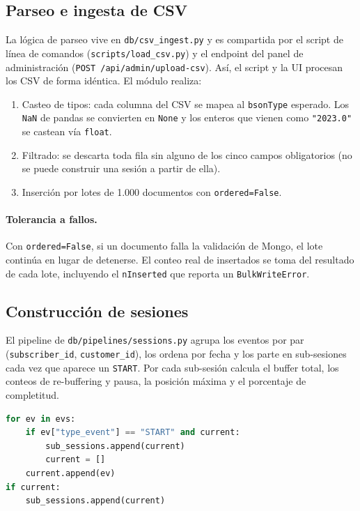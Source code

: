 \documentclass[12pt, letterpaper]{article}
\newcommand{\code}[1]{\texttt{#1}}
\begin{document}
\subsection{Parseo e ingesta de CSV}
La lógica de parseo vive en \code{db/csv\_ingest.py} y es compartida por el
script de línea de comandos (\code{scripts/load\_csv.py}) y el endpoint del panel
de administración (\code{POST /api/admin/upload-csv}). Así, el script y la UI
procesan los CSV de forma idéntica. El módulo realiza:

\begin{enumerate}[leftmargin=*]
  \item Casteo de tipos: cada columna del CSV se mapea al \code{bsonType}
        esperado. Los \code{NaN} de pandas se convierten en \code{None} y los
        enteros que vienen como \code{"2023.0"} se castean vía \code{float}.
  \item Filtrado: se descarta toda fila sin alguno de los cinco campos
        obligatorios (no se puede construir una sesión a partir de ella).
  \item Inserción por lotes de 1.000 documentos con \code{ordered=False}.
\end{enumerate}

\paragraph{Tolerancia a fallos.} Con \code{ordered=False}, si un documento falla
la validación de Mongo, el lote continúa en lugar de detenerse. El conteo real
de insertados se toma del resultado de cada lote, incluyendo el \code{nInserted}
que reporta un \code{BulkWriteError}.

\subsection{Construcción de sesiones}
El pipeline de \code{db/pipelines/sessions.py} agrupa los eventos por par
(\code{subscriber\_id}, \code{customer\_id}), los ordena por fecha y los parte en
sub-sesiones cada vez que aparece un \code{START}. Por cada sub-sesión calcula
el buffer total, los conteos de re-buffering y pausa, la posición máxima y el
porcentaje de completitud.

\begin{lstlisting}[language=Python,caption={Partición en sub-sesiones por evento START (db/pipelines/sessions.py)}]
for ev in evs:
    if ev["type_event"] == "START" and current:
        sub_sessions.append(current)
        current = []
    current.append(ev)
if current:
    sub_sessions.append(current)
\end{lstlisting}
\end{document}
